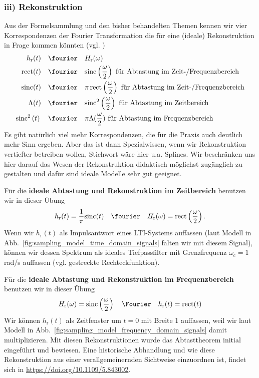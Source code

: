 \subsubsection*{iii) Rekonstruktion}
Aus der Formelsammlung und den bisher behandelten Themen kennen wir vier
Korrespondenzen der Fourier Transformation die für eine (ideale) Rekonstruktion
in Frage kommen könnten (vgl. )
\begin{align}
h_\mathrm{r}(t) \quad\fourier\quad  & H_\mathrm{r}(\omega)\\
\text{rect}(t) \quad\fourier\quad  &\text{sinc}\left( \frac{\omega}{2} \right)\text{ für Abtastung im Zeit-/Frequenzbereich}\\
\text{sinc}(t)  \quad\fourier\quad  &\pi \,\text{rect}\left(\frac{\omega}{2}\right)\text{ für Abtastung im Zeit-/Frequenzbereich}\\
\Lambda(t) \quad\fourier\quad  &\text{sinc}^2\left( \frac{\omega}{2} \right)  \text{ für Abtastung im Zeitbereich}\\
\text{sinc}^2\left( t \right) \quad\fourier\quad  &\pi\Lambda(\frac{\omega}{2})\text{ für Abtastung im Frequenzbereich}
\end{align}
Es gibt natürlich viel mehr Korrespondenzen, die für die Praxis auch deutlich mehr
Sinn ergeben. Aber das ist dann Spezialwissen, wenn wir
Rekonstruktion vertiefter betreiben wollen, Stichwort wäre hier u.a. Splines.
Wir beschränken uns hier darauf das Wesen der Rekonstruktion didaktisch möglichst
zugänglich zu gestalten und dafür sind ideale Modelle sehr gut geeignet.

Für die \textbf{ideale Abtastung und Rekonstruktion im Zeitbereich} benutzen
wir in dieser Übung
\begin{align}
h_\mathrm{r}(t) = \frac{1}{\pi}\text{sinc}(t)
\quad\fourier\quad
H_\mathrm{r}(\omega) = \text{rect}\left(\frac{\omega}{2}\right).
\end{align}
Wenn wir $h_\mathrm{r}(t)$ als Impulsantwort eines LTI-Systems auffassen (laut
Modell in Abb.~\ref{fig:sampling_model_time_domain_signals} falten wir mit diesem Signal), können wir
dessen Spektrum als ideales Tiefpassfilter mit Grenzfrequenz $\omega_c=1$ rad/s auffassen (vgl. gestreckte Rechteckfunktion).
%

Für die \textbf{ideale Abtastung und Rekonstruktion im Frequenzbereich} benutzen
wir in dieser Übung
\begin{align}
H_\mathrm{r}(\omega) = \text{sinc}\left( \frac{\omega}{2} \right)
\quad\Fourier\quad
h_\mathrm{r}(t)  = \text{rect}(t)
\end{align}
Wir können $h_\mathrm{r}(t)$ als Zeitfenster um $t=0$ mit Breite 1 auffassen,
weil wir laut Modell in Abb.~\ref{fig:sampling_model_frequency_domain_signals}
damit multiplizieren.
Mit diesen Rekonstruktionen wurde das Abtasttheorem initial eingeführt und
bewiesen. Eine historische Abhandlung und wie diese Rekonstruktion
aus einer verallgemeinernden Sichtweise einzuordnen ist, findet sich in
\url{https://doi.org/10.1109/5.843002}.

